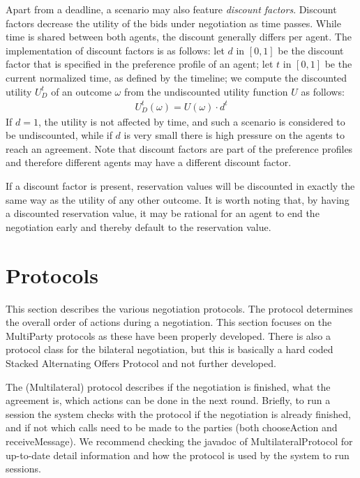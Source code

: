 \documentclass[]{article}
\begin{document}
Apart from a deadline, a scenario may also feature \emph{discount factors}. Discount factors decrease the utility of the bids under negotiation as time passes. While time is shared between both agents, the discount generally differs per agent. The implementation of discount factors is as follows: let $d$ in $[0, 1]$ be the discount factor that is specified in the preference profile of an agent; let $t$ in $[0, 1]$ be the current normalized time, as defined by the timeline; we compute the discounted utility $U_D^t$ of an outcome $\omega$ from the undiscounted utility function $U$ as follows:
\begin{eqnarray}
U_D^t(\omega) = U(\omega) \cdot d^t
\end{eqnarray}
If $d = 1$, the utility is not affected by time, and such a scenario is considered to be undiscounted, while if $d$ is very small there is high pressure on the agents to reach an agreement. Note that discount factors are part of the preference profiles and therefore different agents may have a different discount factor.

If a discount factor is present, reservation values will be discounted in exactly the same way as the utility of any other outcome. It is worth noting that, by having a discounted reservation value, it may be rational for an agent to end the negotiation early and thereby default to the reservation value.
 
\section{Protocols}\label{sec:protocols}
This section describes the various negotiation protocols. The protocol determines the overall order of actions during a negotiation.
This section focuses on the MultiParty protocols as these have been properly developed. There is also a protocol class for the bilateral negotiation, but this is basically a hard coded Stacked Alternating Offers Protocol and not further developed. 

  The (Multilateral)  protocol describes if the negotiation is finished, what the agreement is, which actions can be done in the next round.   Briefly, to run a session the system checks with the protocol if the negotiation is already finished,  and if not which calls need to be made to the parties (both chooseAction and receiveMessage).  We recommend checking the javadoc of MultilateralProtocol for up-to-date detail information and how the protocol is used by the system to run sessions.
  
\end{document}
